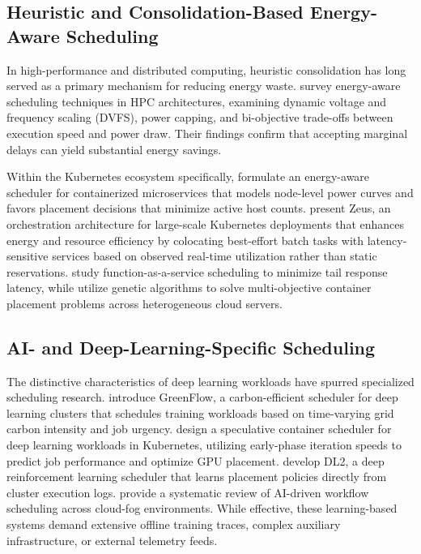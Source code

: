 \documentclass[a4paper,fleqn]{cas-dc}
\begin{document}
\subsection{Heuristic and Consolidation-Based Energy-Aware Scheduling}
In high-performance and distributed computing, heuristic consolidation has long served as a primary mechanism for reducing energy waste. \citet{kocot2023energy} survey energy-aware scheduling techniques in HPC architectures, examining dynamic voltage and frequency scaling (DVFS), power capping, and bi-objective trade-offs between execution speed and power draw. Their findings confirm that accepting marginal delays can yield substantial energy savings.

Within the Kubernetes ecosystem specifically, \citet{rao2025energy} formulate an energy-aware scheduler for containerized microservices that models node-level power curves and favors placement decisions that minimize active host counts. \citet{zhang2021zeus} present Zeus, an orchestration architecture for large-scale Kubernetes deployments that enhances energy and resource efficiency by colocating best-effort batch tasks with latency-sensitive services based on observed real-time utilization rather than static reservations. \citet{zuk2022reducing} study function-as-a-service scheduling to minimize tail response latency, while \citet{chen2024optimal} utilize genetic algorithms to solve multi-objective container placement problems across heterogeneous cloud servers.

\subsection{AI- and Deep-Learning-Specific Scheduling}
The distinctive characteristics of deep learning workloads have spurred specialized scheduling research. \citet{gu2025greenflow} introduce GreenFlow, a carbon-efficient scheduler for deep learning clusters that schedules training workloads based on time-varying grid carbon intensity and job urgency. \citet{mao2021speculative} design a speculative container scheduler for deep learning workloads in Kubernetes, utilizing early-phase iteration speeds to predict job performance and optimize GPU placement. \citet{peng2021dl2} develop DL2, a deep reinforcement learning scheduler that learns placement policies directly from cluster execution logs. \citet{khaledian2024aibased} provide a systematic review of AI-driven workflow scheduling across cloud-fog environments. While effective, these learning-based systems demand extensive offline training traces, complex auxiliary infrastructure, or external telemetry feeds.
\end{document}

